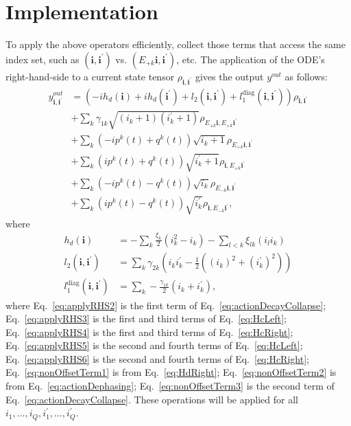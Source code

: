 \documentclass[letterpaper]{article}
\newcommand{\bfi}{\boldsymbol{i}}
\newcommand{\Epk}{E_{+k}}
\newcommand{\Emk}{E_{-k}}
\newcommand{\YC}[1]{{\textcolor{Bronze}{#1}}}
\begin{document}
\section{Implementation}

  To apply the above operators efficiently, collect those terms that access the same index set, such as $(\bfi,\bfi^\prime)$ vs. $(E_{+k}\bfi, \bfi^\prime)$, etc. The application of the ODE's right-hand-side to a current state tensor $\rho_{\bfi,\bfi^\prime}$ gives the output $y^{out}$ as follows:
  \begin{align} 
       y^{out}_{\bfi,\bfi^\prime}  &= 
       \left(-i h_d(\bfi) + ih_d(\bfi^\prime)
        + l_2(\bfi,\bfi^\prime) + l_1^{\text{diag}}(\bfi, \bfi^\prime) \right)
        \rho_{\bfi,\bfi^\prime} \label{eq:applyRHS1} \\
        &+ \sum_k \gamma_{1k} \sqrt{(i_k+1)(i_k^\prime+1)} \rho_{E_{+k}\bfi,
        E_{+k}\bfi^\prime} \label{eq:applyRHS2} \\
        &+ \sum_k \left(-ip^k(t) + q^k(t)\right) \sqrt{i_k+1} \rho_{\Epk \bfi,
        \bfi^\prime} \label{eq:applyRHS3} \\
        &+ \sum_k \left( ip^k(t) + q^k(t)\right) \sqrt{i_k^\prime+1}
        \rho_{\bfi,\Epk \bfi^\prime} \label{eq:applyRHS4} \\
        &+ \sum_k \left(-ip^k(t) - q^k(t)\right) \sqrt{i_k} \rho_{\Emk \bfi,
        \bfi^\prime} \label{eq:applyRHS5} \\
        &+ \sum_k \left( ip^k(t) - q^k(t)\right) \sqrt{i_k^\prime}
        \rho_{\bfi,\Emk \bfi^\prime},  \label{eq:applyRHS6}
  \end{align}
  where 
  \begin{align}
    h_d(\bfi) &= -\sum_k \frac{\xi_k}{2}(i_k^2 - i_k) - \sum_{l<k} \xi_{lk} (i_l
    i_k) \label{eq:nonOffsetTerm1} \\
    l_2(\bfi,\bfi^\prime) &= \sum_k \gamma_{2k} \left(i_ki_k^\prime - \frac 12
    \left( (i_k)^2 + (i_k^\prime)^2\right) \right) \label{eq:nonOffsetTerm2} \\
    l_1^{\text{diag}}(\bfi, \bfi^\prime) &= \sum_k
    -\frac{\gamma_{1k}}{2}\left(i_k + i_k^\prime\right),
    \label{eq:nonOffsetTerm3} 
  \end{align}
  \YC{where Eq.~\eqref{eq:applyRHS2} is the first term of
  Eq.~\eqref{eq:actionDecayCollapse}; Eq.~\eqref{eq:applyRHS3} is the first and
  third terms of Eq.~\eqref{eq:HcLeft}; Eq.~\eqref{eq:applyRHS4} is the first
  and third terms of Eq.~\eqref{eq:HcRight}; Eq.~\eqref{eq:applyRHS5} is the
  second and fourth terms of Eq.~\eqref{eq:HcLeft}; Eq.~\eqref{eq:applyRHS6} is
  the second and fourth terms of Eq.~\eqref{eq:HcRight};
  Eq.~\eqref{eq:nonOffsetTerm1} is from Eq.~\eqref{eq:HdRight};
  Eq.~\eqref{eq:nonOffsetTerm2} is from Eq.~\eqref{eq:actionDephasing};
  Eq.~\eqref{eq:nonOffsetTerm3} is the second term of
  Eq.~\eqref{eq:actionDecayCollapse}.}
  These operations will be applied for all $i_1,\dots, i_Q, i_1^\prime, \dots,
  i_Q^\prime$. 
  
\end{document}
